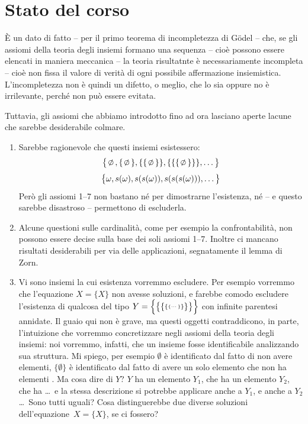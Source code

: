 \section*{Stato del corso}
\`E un dato di fatto -- per il primo teorema di incompletezza di G\"odel -- che, se gli assiomi della teoria degli insiemi formano una sequenza  -- cio\`e possono essere elencati 
in maniera meccanica -- la teoria risultatnte \`e necessariamente incompleta -- cio\`e non fissa il valore di verit\`a di ogni possibile affermazione insiemistica. L'incompletezza non \`e quindi un difetto, o meglio, che lo sia oppure no \`e irrilevante, perch\'e 
non pu\`o essere evitata.

Tuttavia, gli assiomi che abbiamo introdotto fino ad ora lasciano aperte lacune che sarebbe desiderabile colmare.

\begin{enumerate}[1.]
	\item Sarebbe ragionevole che questi insiemi esistessero:
	\[ \big\oldparen\emptyset, \{\emptyset\}, \{\{\emptyset\}\}, \{\{\{\emptyset\}\}\}, \ldots\big\}
		\]\[ \big\{\omega, s(\omega), s(s(\omega)), s(s(s(\omega))),\ldots\big\}
			\]
	Per\`o gli assiomi 1--7 non bastano n\'e per dimostrarne l'esistenza, n\'e -- e questo sarebbe disastroso -- permettono di escluderla.

	\item Alcune questioni sulle cardinalit\`a, come per esempio la confrontabilit\`a, non possono essere decise sulla base dei soli assiomi 1--7.
	Inoltre ci mancano risultati desiderabili per via delle applicazioni, segnatamente il lemma di Zorn.

	\item Vi sono insiemi la cui esistenza vorremmo escludere. Per esempio vorremmo che l'equazione $X = \{X\}$ non avesse soluzioni, e farebbe comodo escludere 
	l'esistenza di qualcosa del tipo $Y = \Big\oldparen\big\oldparen\{\raisebox{.8pt}{\mathshift\scriptstyle\{\raisebox{.6pt}{\mathshift\scriptscriptstyle\{\cdots\}\mathshift}{}\}\mathshift}{}\}\big\}\Big\}$ con infinite parentesi annidate. Il guaio qui non \`e grave, ma questi oggetti contraddicono, in parte, l'intuizione che vorremmo 
	concretizzare negli assiomi della teoria degli insiemi: noi vorremmo, infatti, che un insieme fosse identificabile analizzando sua struttura. Mi spiego, per esempio $\emptyset$ \`e identificato dal fatto di non avere elementi,
	$\{\emptyset\}$ \`e identificato dal fatto di avere un solo elemento che non ha elementi \etc. Ma cosa dire di $Y$? $Y$ ha un elemento $Y_1$, che ha un elemento $Y_2$,
	che ha \ldots\ e la stessa descrizione si potrebbe applicare anche a $Y_1$, e anche a $Y_2$ \ldots\ Sono tutti uguali? Cosa distinguerebbe due diverse soluzioni dell'equazione~$X=\{X\}$, se ci fossero?
\end{enumerate}

